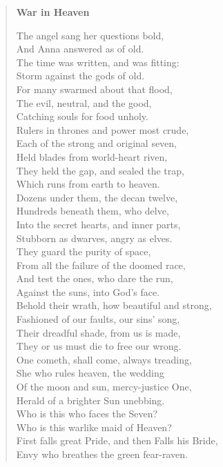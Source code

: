 \begin{verse}
\textbf{War in Heaven}

The angel sang her questions bold,\\
And Anna answered as of old.\\
The time was written, and was fitting:\\
Storm against the gods of old.\\
For many swarmed about that flood,\\
The evil, neutral, and the good,\\
Catching souls for food unholy.\\
Rulers in thrones and power most crude,\\
Each of the strong and original seven,\\
Held blades from world-heart riven,\\
They held the gap, and sealed the trap,\\
Which runs from earth to heaven.\\
Dozens under them, the decan twelve,\\
Hundreds beneath them, who delve,\\
Into the secret hearts, and inner parts,\\
Stubborn as dwarves, angry as elves.\\
They guard the purity of space,\\
From all the failure of the doomed race,\\
And test the ones, who dare the run,\\
Against the suns, into God's face.\\
Behold their wrath, how beautiful and strong,\\
Fashioned of our faults, our sins' song,\\
Their dreadful shade, from us is made,\\
They or us must die to free our wrong.\\
One cometh, shall come, always treading,\\
She who rules heaven, the wedding\\
Of the moon and sun, mercy-justice One,\\
Herald of a brighter Sun unebbing.\\
Who is this who faces the Seven?\\
Who is this warlike maid of Heaven?\\
First falls great Pride, and then Falls his Bride,\\
Envy who breathes the green fear-raven.\\

\end{verse}
